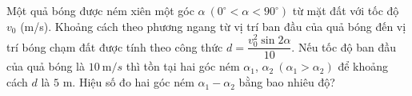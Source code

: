 \begin{ex}%
	Một quả bóng được ném xiên một góc $\alpha~\left(0^{\circ} < \alpha < 90^{\circ}\right)$ từ mặt đất với tốc độ $v_0$ (m/s). Khoảng cách theo phương ngang từ vị trí ban đầu của quả bóng đến vị trí bóng chạm đất được tính theo công thức $d=\dfrac{v_0^2\sin 2\alpha}{10}$. Nếu tốc độ ban đầu của quả bóng là $10\mathrm{~m} / s$ thì tồn tại hai góc ném $\alpha_1$, $\alpha_2~\left(\alpha_1 > \alpha_2\right)$ để khoảng cách $d$ là $5$ m. Hiệu số đo hai góc ném $\alpha_1-\alpha_2$ bằng bao nhiêu độ?

\end{ex}

